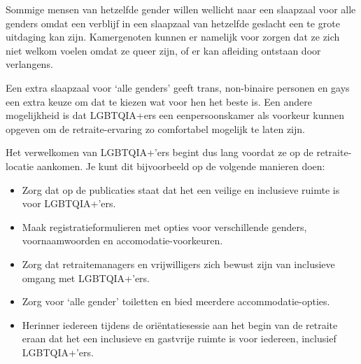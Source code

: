 \documentclass[12pt,openany]{book}
\begin{document}
Sommige mensen van hetzelfde gender willen wellicht naar een slaapzaal voor alle genders omdat een verblijf in een slaapzaal van hetzelfde geslacht een te grote uitdaging kan zijn. Kamergenoten kunnen er namelijk voor zorgen dat ze zich niet welkom voelen omdat ze queer zijn, of er kan afleiding ontstaan door verlangens.

Een extra slaapzaal voor `alle genders' geeft trans, non-binaire personen en gays een extra keuze om dat te kiezen wat voor hen het beste is. Een andere mogelijkheid is dat LGBTQIA+ers een eenpersoonskamer als voorkeur kunnen opgeven om de retraite-ervaring zo comfortabel mogelijk te laten zijn. 

Het verwelkomen van LGBTQIA+'ers begint dus lang voordat ze op de retraite-locatie aankomen. Je kunt dit bijvoorbeeld op de volgende manieren doen:

\begin{itemize}
  \setlength\itemsep{-0.3em}
  \item Zorg dat op de publicaties staat dat het een veilige en inclusieve ruimte is voor LGBTQIA+'ers.
  \item Maak registratieformulieren met opties voor verschillende genders, voornaamwoorden en accomodatie-voorkeuren.
  \item Zorg dat retraitemanagers en vrijwilligers zich bewust zijn van inclusieve omgang met LGBTQIA+'ers.
  \item Zorg voor `alle gender' toiletten en bied meerdere accommodatie-opties.
  \item Herinner iedereen tijdens de oriëntatiesessie aan het begin van de retraite eraan dat het een inclusieve en gastvrije ruimte is voor iedereen, inclusief LGBTQIA+'ers.
\end{itemize}

\begin{figure}[h]
    \centering
\end{figure}
\end{document}
